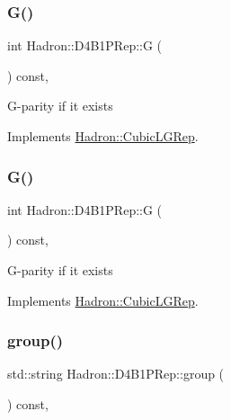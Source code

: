 \subsubsection{\texorpdfstring{G()}{G()}\hspace{0.1cm}{\footnotesize\ttfamily [2/3]}}
{\footnotesize\ttfamily int Hadron\+::\+D4\+B1\+P\+Rep\+::G (\begin{DoxyParamCaption}{ }\end{DoxyParamCaption}) const\hspace{0.3cm}{\ttfamily [inline]}, {\ttfamily [virtual]}}

G-\/parity if it exists 

Implements \mbox{\hyperlink{structHadron_1_1CubicLGRep_ace26f7b2d55e3a668a14cb9026da5231}{Hadron\+::\+Cubic\+L\+G\+Rep}}.

\mbox{\label{structHadron_1_1D4B1PRep_adfa5387ae565f08f17ba9dc4d10c9546}} 
\subsubsection{\texorpdfstring{G()}{G()}\hspace{0.1cm}{\footnotesize\ttfamily [3/3]}}
{\footnotesize\ttfamily int Hadron\+::\+D4\+B1\+P\+Rep\+::G (\begin{DoxyParamCaption}{ }\end{DoxyParamCaption}) const\hspace{0.3cm}{\ttfamily [inline]}, {\ttfamily [virtual]}}

G-\/parity if it exists 

Implements \mbox{\hyperlink{structHadron_1_1CubicLGRep_ace26f7b2d55e3a668a14cb9026da5231}{Hadron\+::\+Cubic\+L\+G\+Rep}}.

\mbox{\label{structHadron_1_1D4B1PRep_a2826854e4c6a3edb94112b11b577702b}} 
\subsubsection{\texorpdfstring{group()}{group()}\hspace{0.1cm}{\footnotesize\ttfamily [1/3]}}
{\footnotesize\ttfamily std\+::string Hadron\+::\+D4\+B1\+P\+Rep\+::group (\begin{DoxyParamCaption}{ }\end{DoxyParamCaption}) const\hspace{0.3cm}{\ttfamily [inline]}, {\ttfamily [virtual]}}

